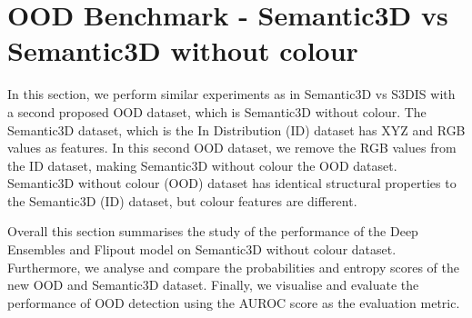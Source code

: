     \section{OOD Benchmark - Semantic3D vs Semantic3D without colour}
    In this section, we perform similar experiments as in Semantic3D vs S3DIS with a second proposed OOD dataset, which is Semantic3D without colour.
    The Semantic3D dataset, which is the In Distribution (ID) dataset has XYZ and RGB values as features.
    In this second OOD dataset, we remove the RGB values from the ID dataset, making Semantic3D without colour the OOD dataset.
    Semantic3D without colour (OOD) dataset has identical structural properties to the Semantic3D (ID) dataset, but colour features are different.

    Overall this section summarises the study of the performance of the Deep Ensembles and Flipout model on Semantic3D without colour dataset.
    Furthermore, we analyse and compare the probabilities and entropy scores of the new OOD and Semantic3D dataset.
    Finally, we visualise and evaluate the performance of OOD detection using the AUROC score as the evaluation metric.
